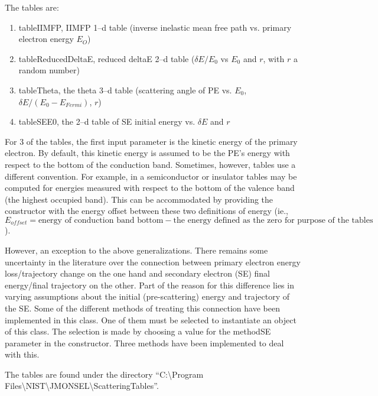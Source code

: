 The tables are:
\begin{enumerate}
    \item tableIIMFP, IIMFP 1--d table (inverse inelastic mean free path vs. primary electron energy $E_O$)
    \item tableReducedDeltaE, reduced deltaE 2--d table ($\delta E/E_0$ vs $E_0$ and $r$, with $r$ a random number)
    \item tableTheta, the theta 3--d table (scattering angle of PE vs. $E_0$, $\delta E/(E_0-E_{Fermi})$, $r$)
    \item tableSEE0, the 2--d table of SE initial energy vs. $\delta E$ and $r$
\end{enumerate}

For 3 of the tables, the first input parameter is the kinetic energy of the primary electron. By default, this kinetic energy is assumed to be the PE's energy with respect to the bottom of the conduction band. Sometimes, however, tables use a different convention. For example, in a semiconductor or insulator tables may be computed for energies measured with respect to the bottom of the valence band (the highest occupied band). This can be accommodated by providing the constructor with the energy offset between these two definitions of energy (ie., $E_{offset} = \text{energy of conduction band bottom} - \text{the energy defined as the zero for purpose of the tables}$).

However, an exception to the above generalizations. There remains some uncertainty in the literature over the connection between primary electron energy loss/trajectory change on the one hand and secondary electron (SE) final energy/final trajectory on the other. Part of the reason for this difference lies in varying assumptions about the initial (pre-scattering) energy and trajectory of the SE. Some of the different methods of treating this connection have been implemented in this class. One of them must be selected to instantiate an object of this class. The selection is made by choosing a value for the methodSE parameter in the constructor. Three methods have been implemented to deal with this.

The tables are found under the directory ``C:\textbackslash Program Files\textbackslash NIST\textbackslash JMONSEL\textbackslash ScatteringTables''.

